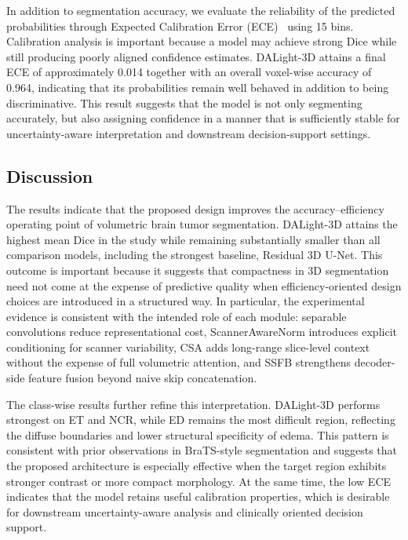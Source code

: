 \documentclass[conference]{IEEEtran}
\begin{document}
In addition to segmentation accuracy, we evaluate the reliability of the predicted probabilities through Expected Calibration Error (ECE)~\cite{guo2017calibration} using 15 bins. Calibration analysis is important because a model may achieve strong Dice while still producing poorly aligned confidence estimates. DALight-3D attains a final ECE of approximately 0.014 together with an overall voxel-wise accuracy of 0.964, indicating that its probabilities remain well behaved in addition to being discriminative. This result suggests that the model is not only segmenting accurately, but also assigning confidence in a manner that is sufficiently stable for uncertainty-aware interpretation and downstream decision-support settings.

\subsection{Discussion}
\label{sec:discussion}

The results indicate that the proposed design improves the accuracy--efficiency operating point of volumetric brain tumor segmentation. DALight-3D attains the highest mean Dice in the study while remaining substantially smaller than all comparison models, including the strongest baseline, Residual 3D U-Net. This outcome is important because it suggests that compactness in 3D segmentation need not come at the expense of predictive quality when efficiency-oriented design choices are introduced in a structured way. In particular, the experimental evidence is consistent with the intended role of each module: separable convolutions reduce representational cost, ScannerAwareNorm introduces explicit conditioning for scanner variability, CSA adds long-range slice-level context without the expense of full volumetric attention, and SSFB strengthens decoder-side feature fusion beyond naive skip concatenation.

The class-wise results further refine this interpretation. DALight-3D performs strongest on ET and NCR, while ED remains the most difficult region, reflecting the diffuse boundaries and lower structural specificity of edema. This pattern is consistent with prior observations in BraTS-style segmentation and suggests that the proposed architecture is especially effective when the target region exhibits stronger contrast or more compact morphology. At the same time, the low ECE indicates that the model retains useful calibration properties, which is desirable for downstream uncertainty-aware analysis and clinically oriented decision support.
\end{document}
